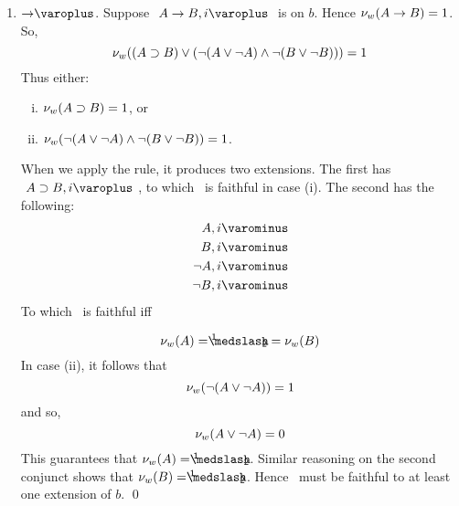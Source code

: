 \begin{proof*}
\begin{enumerate}
		\item $\dRule{ \arrow }$. 	Suppose $ \like{\dNodei{ A \arrow B }} $ is on $ b $.
							Hence $ \mathcal{\nu}_{ w }({ A \rightarrow B }) = 1 $. So,
							\[ \mathcal{\nu}_{ w }({ (A \supset B) \vee ( \neg (A \vee \neg A) \wedge \neg (B \vee \neg B )) }) = 1 \]
							Thus either:
							\begin{enumerate}[(i)]
								\item $ \mathcal{\nu}_{ w }({ A \supset B }) = 1 $, or
								\item $ \mathcal{\nu}_{ w }({ \neg (A \vee \neg A) \wedge \neg (B \vee \neg B ) }) = 1 $.
							\end{enumerate}
							When we apply the \dRule{ \arrow } rule, it produces two extensions. 
							The first has $ \like{ \dNodei{ A \supset B }} $, to which \Model\ is faithful in case (i).
							The second has the following:
							\begin{eqnarray*}
							 	\like{\uNodei{A}}\\
								\like{\uNodei{B}}\\
								\like{\uNodei{\neg A}}\\
								\like{\uNodei{\neg B}} 
							\end{eqnarray*}
							To which \Model\ is faithful iff
							
							\[ \Valww{ A } = \oneHalf = \Valww{ B } \]
							In case (ii), it follows that
							\[	\mathcal{\nu}_{ w }({ \neg( A \vee \neg A ) }) = 1 \]
							and so,
							\[ \mathcal{\nu}_{ w }({ A \vee \neg A }) = 0 \]
							This guarantees that $ \Valww{ A } = \oneHalf $. Similar reasoning on the second conjunct shows that $ \Valww{ B } = \oneHalf $. 
							Hence \Model\ must be faithful to at least one extension of $ b $.
							\qed


\end{enumerate}
\end{proof*}
